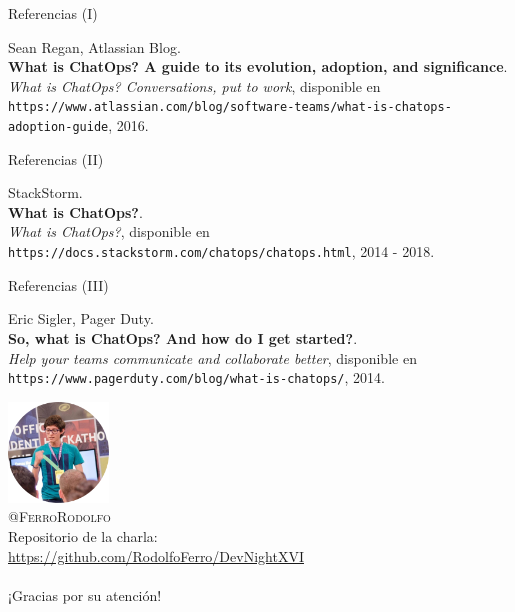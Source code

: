 \documentclass[usenames,dvipsnames]{beamer}
\begin{document}
  \begin{frame}{Referencias (I)}
    \begin{enumerate}[{[}1{]}]
      \item Sean Regan, Atlassian Blog.\\
      \textbf{What is ChatOps? A guide to its evolution, adoption, and significance}.\\
      \textit{What is ChatOps? Conversations, put to work},
      disponible en \texttt{https://www.atlassian.com/blog/software-teams/what-is-chatops-adoption-guide}, 2016.
    \end{enumerate}
  \end{frame}

  \begin{frame}{Referencias (II)}
    \begin{enumerate}[{[}3{]}]
      \item StackStorm.\\
      \textbf{What is ChatOps?}.\\
      \textit{What is ChatOps?},
      disponible en \texttt{https://docs.stackstorm.com/chatops/chatops.html}, 2014 - 2018.
    \end{enumerate}
  \end{frame}

  \begin{frame}{Referencias (III)}
    \begin{enumerate}[{[}3{]}]
      \item Eric Sigler, Pager Duty.\\
      \textbf{So, what is ChatOps? And how do I get started?}.\\
      \textit{Help your teams communicate and collaborate better},
      disponible en \texttt{https://www.pagerduty.com/blog/what-is-chatops/}, 2014.
    \end{enumerate}
  \end{frame}

  \begin{frame}[standout]
    \includegraphics[width=0.2\textwidth]{imgs/me}\\
    {\color{Turquoise} \textsc{@FerroRodolfo}}\\
    Repositorio de la charla:\\
    {\color{orange} \url{https://github.com/RodolfoFerro/DevNightXVI}}\\
    \vspace*{0.3cm}
    \noindent {\color{white} \rule{0.3\linewidth}{1mm} }\\
    \vspace*{0.3cm}
    ¡Gracias por su atención!
  \end{frame}
\end{document}
